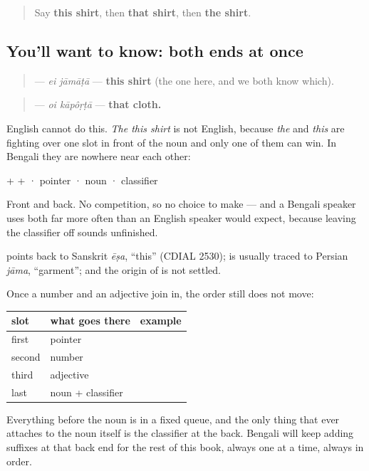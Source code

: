 \label{lesson:BN-C21-dem-order}



\begin{quote}
Say \textbf{this shirt}, then \textbf{that shirt}, then \textbf{the shirt}.
\end{quote}

\subsection*{You'll want to know: both ends at once}
\begin{quote}
\textbf{ } — \emph{ei jāmāṭā} — \textbf{this shirt} (the one here, and we both know which).
\end{quote}

\begin{quote}
\textbf{ } — \emph{oi kāpôṛṭā} — \textbf{that cloth.}
\end{quote}

English cannot do this. \emph{The this shirt} is not English, because \emph{the} and \emph{this} are fighting over one slot in front of the noun and only one of them can win. In Bengali they are nowhere near each other:

\textbf{} + \textbf{} + \textbf{} · pointer · noun · classifier

Front and back. No competition, so no choice to make — and a Bengali speaker uses both far more often than an English speaker would expect, because leaving the classifier off sounds unfinished.

\begin{cousinweb}
\textbf{} points back to Sanskrit \emph{ēṣa}, \textquotedblleft{}this\textquotedblright{} (CDIAL 2530); \textbf{} is usually traced to Persian \emph{jāma}, \textquotedblleft{}garment\textquotedblright{}; and the origin of \textbf{} is not settled.
\end{cousinweb}

\begin{grammarlens}[title={Grammar Lens: the fixed order}]
Once a number and an adjective join in, the order still does not move:

\noindent
\begin{tabularx}{\linewidth}{@{}>{\raggedright\arraybackslash}X>{\raggedright\arraybackslash}X>{\raggedright\arraybackslash}X@{}}
\toprule
\textbf{slot} & \textbf{what goes there} & \textbf{example} \\
\midrule
first & pointer & \textbf{\bn{এই}} \\
second & number & \textbf{\bn{একটা}} \\
third & adjective & \textbf{\bn{লাল}} \\
last & noun + classifier & \textbf{\bn{জামাটা}} \\
\bottomrule
\end{tabularx}

Everything before the noun is in a fixed queue, and the only thing that ever attaches to the noun itself is the classifier at the back. Bengali will keep adding suffixes at that back end for the rest of this book, always one at a time, always in order.
\end{grammarlens}

